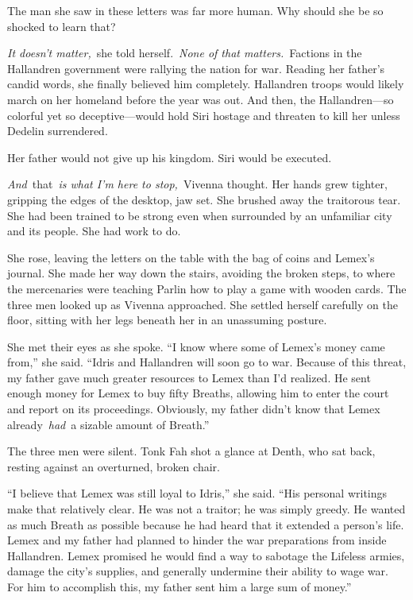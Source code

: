 The man she saw in these letters was far more human. Why should she be so shocked to learn that?

\textit{It doesn’t matter,}~she told herself.~\textit{None of that matters.}~Factions in the Hallandren government were rallying the nation for war. Reading her father’s candid words, she finally believed him completely. Hallandren troops would likely march on her homeland before the year was out. And then, the Hallandren—so colorful yet so deceptive—would hold Siri hostage and threaten to kill her unless Dedelin surrendered.

Her father would not give up his kingdom. Siri would be executed.

\textit{And}~that~\textit{is what I’m here to stop,}~Vivenna thought. Her hands grew tighter, gripping the edges of the desktop, jaw set. She brushed away the traitorous tear. She had been trained to be strong even when surrounded by an unfamiliar city and its people. She had work to do.

She rose, leaving the letters on the table with the bag of coins and Lemex’s journal. She made her way down the stairs, avoiding the broken steps, to where the mercenaries were teaching Parlin how to play a game with wooden cards. The three men looked up as Vivenna approached. She settled herself carefully on the floor, sitting with her legs beneath her in an unassuming posture.

She met their eyes as she spoke. “I know where some of Lemex’s money came from,” she said. “Idris and Hallandren will soon go to war. Because of this threat, my father gave much greater resources to Lemex than I’d realized. He sent enough money for Lemex to buy fifty Breaths, allowing him to enter the court and report on its proceedings. Obviously, my father didn’t know that Lemex already~\textit{had}~a sizable amount of Breath.”

The three men were silent. Tonk Fah shot a glance at Denth, who sat back, resting against an overturned, broken chair.

“I believe that Lemex was still loyal to Idris,” she said. “His personal writings make that relatively clear. He was not a traitor; he was simply greedy. He wanted as much Breath as possible because he had heard that it extended a person’s life. Lemex and my father had planned to hinder the war preparations from inside Hallandren. Lemex promised he would find a way to sabotage the Lifeless armies, damage the city’s supplies, and generally undermine their ability to wage war. For him to accomplish this, my father sent him a large sum of money.”

